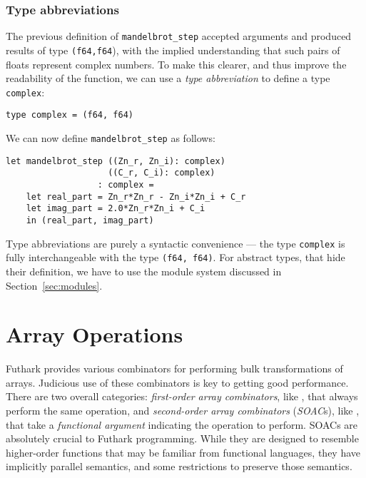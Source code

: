 \documentclass[oneside,11pt]{book}
\begin{document}
\subsubsection{Type abbreviations}
\label{sec:type-abbreviations}

The previous definition of \lstinline{mandelbrot_step} accepted
arguments and produced results of type \lstinline{(f64,f64}), with the
implied understanding that such pairs of floats represent complex
numbers.  To make this clearer, and thus improve the readability of
the function, we can use a \textit{type abbreviation} to define a type
\lstinline{complex}:

\begin{lstlisting}
type complex = (f64, f64)
\end{lstlisting}

We can now define \lstinline{mandelbrot_step} as follows:

\begin{lstlisting}
let mandelbrot_step ((Zn_r, Zn_i): complex)
                    ((C_r, C_i): complex)
                  : complex =
    let real_part = Zn_r*Zn_r - Zn_i*Zn_i + C_r
    let imag_part = 2.0*Zn_r*Zn_i + C_i
    in (real_part, imag_part)
\end{lstlisting}

Type abbreviations are purely a syntactic convenience --- the type
\lstinline{complex} is fully interchangeable with the type
\lstinline{(f64, f64)}.  For abstract types, that hide their
definition, we have to use the module system discussed in
Section~\ref{sec:modules}.

\section{Array Operations}

Futhark provides various combinators for performing bulk
transformations of arrays.  Judicious use of these combinators is key
to getting good performance.  There are two overall categories:
\textit{first-order array combinators}, like , that
always perform the same operation, and \textit{second-order array
  combinators} (\textit{SOAC}s), like , that take a
\textit{functional argument} indicating the operation to perform.
SOACs are absolutely crucial to Futhark programming.  While they are
designed to resemble higher-order functions that may be familiar from
functional languages, they have implicitly parallel semantics, and
some restrictions to preserve those semantics.
\end{document}
